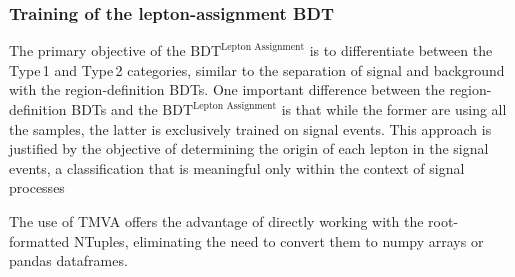 \subsubsection{Training of the lepton-assignment BDT}
\label{sec:ChaptH:Sig:LepAsign:SS:BDT:Training}
The primary objective of the $\text{BDT}^{\text{Lepton Assignment}}$ is to differentiate 
between the Type$\,$1 and Type$\,$2 categories, similar to the separation 
of signal and background with the region-definition BDTs. %
One important
difference between the region-definition BDTs and the $\text{BDT}^{\text{Lepton Assignment}}$
is that while the former are using all the samples, the latter is exclusively trained 
on \dilepSStau signal events. This approach is justified by the objective of 
determining the origin of each lepton in the signal events, a classification 
that is meaningful only within the context of signal processes

 
The use of TMVA offers the advantage of directly 
working with the root-formatted NTuples, eliminating the need to 
convert them to numpy arrays or pandas dataframes.


